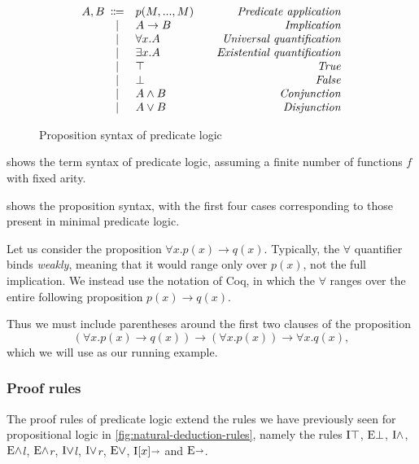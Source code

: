 \begin{figure}[htbp]
    \[
    \begin{array}{r@{\hspace{.5em}}cl@{\hspace{2em}}r}
        A, B & \Coloneqq & p(M,...,M) & \emph{Predicate application} \\
        & | & A \to B & \emph{Implication} \\
        & | & \forall x. A & \emph{Universal quantification} \\
        & | & \exists x. A & \emph{Existential quantification} \\
        & | & \top & \emph{True} \\
        & | & \bot & \emph{False} \\
        & | & A \land B & \emph{Conjunction} \\
        & | & A \lor B & \emph{Disjunction}
    \end{array}
    \]
    \caption{Proposition syntax of predicate logic}
    \label{fig:predicate-logic-prop-syntax}
\end{figure}

 shows the term syntax of predicate logic,
assuming a finite number of functions $f$ with fixed arity.

 shows the proposition syntax, with the first four cases
corresponding to those present in minimal predicate logic.

Let us consider the proposition $\forall x. p(x) \to q(x)$.
Typically, the $\forall$ quantifier binds \emph{weakly}, meaning that it would range only over $p(x)$,
not the full implication.
We instead use the notation of Coq, in which the $\forall$ ranges over the entire following proposition
$p(x) \to q(x)$.

Thus we must include parentheses around the first two clauses of the proposition
\[ (\forall x. p(x) \to q(x)) \to (\forall x. p(x)) \to \forall x. q(x) ,\]
which we will use as our running example.


\subsubsection{Proof rules}
The proof rules of predicate logic extend the rules we have previously seen for propositional logic
in \cref{fig:natural-deduction-rules}, namely the rules $\text{I} \top$, $\text{E} \bot$, $\text{I} \land$, $\text{E} \land$$l$, $\text{E} \land$$r$, $\text{I} \lor$$l$, $\text{I} \lor$$r$, $\text{E} \lor$, $\text{I}[x] \kern -.25em \shortrightarrow$ and $\text{E} \kern -.25em \shortrightarrow$.

